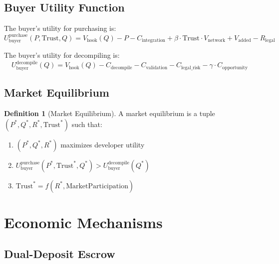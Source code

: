 \documentclass[11pt,a4paper]{article}
\theoremstyle{definition}
\newtheorem{definition}{Definition}[section]
\theoremstyle{remark}
\newcommand{\hook}{\text{hook}}
\newcommand{\buyer}{\text{buyer}}
\begin{document}
\subsection{Buyer Utility Function}

The buyer's utility for purchasing is:
\begin{equation}
U_{\buyer}^{\text{purchase}}(P, \text{Trust}, Q) = V_{\hook}(Q) - P - C_{\text{integration}} + \beta \cdot \text{Trust} \cdot V_{\text{network}} + V_{\text{added}} - R_{\text{legal}}
\end{equation}

The buyer's utility for decompiling is:
\begin{equation}
U_{\buyer}^{\text{decompile}}(Q) = V_{\hook}(Q) - C_{\text{decompile}} - C_{\text{validation}} - C_{\text{legal\_risk}} - \gamma \cdot C_{\text{opportunity}}
\end{equation}

\subsection{Market Equilibrium}

\begin{definition}[Market Equilibrium]
A market equilibrium is a tuple $(P^*, Q^*, R^*, \text{Trust}^*)$ such that:
\begin{enumerate}
    \item $(P^*, Q^*, R^*)$ maximizes developer utility
    \item $U_{\buyer}^{\text{purchase}}(P^*, \text{Trust}^*, Q^*) > U_{\buyer}^{\text{decompile}}(Q^*)$
    \item $\text{Trust}^* = f(R^*, \text{MarketParticipation})$
\end{enumerate}
\end{definition}


\section{Economic Mechanisms}
\label{sec:mechanisms}

\subsection{Dual-Deposit Escrow}
\end{document}
